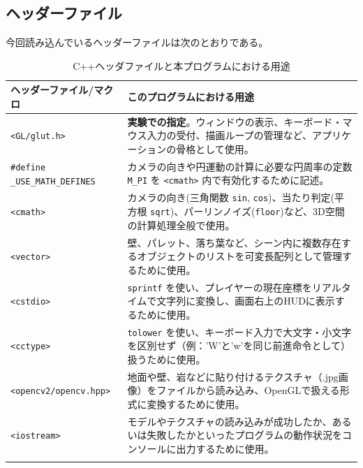 \documentclass[upIatex,dvipdfmx,a4paper]{jsarticle}
\begin{document}
\subsection{ヘッダーファイル}
今回読み込んでいるヘッダーファイルは次のとおりである。
\begin{table}[H]
    \centering
    \caption{C++ヘッダファイルと本プログラムにおける用途}
    \label{tab:cpp_headers_intent}
    \begin{tabular}{lp{10cm}}
    \toprule
    \textbf{ヘッダーファイル/マクロ} & \textbf{このプログラムにおける用途} \\
    \midrule
    \texttt{<GL/glut.h>} & \textbf{実験での指定}。ウィンドウの表示、キーボード・マウス入力の受付、描画ループの管理など、アプリケーションの骨格として使用。 \\ \addlinespace

    \texttt{\#define \_USE\_MATH\_DEFINES} & カメラの向きや円運動の計算に必要な円周率の定数 \texttt{M\_PI} を \texttt{<cmath>} 内で有効化するために記述。 \\ \addlinespace

    \texttt{<cmath>} & カメラの向き(三角関数 \texttt{sin}, \texttt{cos})、当たり判定(平方根 \texttt{sqrt})、パーリンノイズ(\texttt{floor})など、3D空間の計算処理全般で使用。 \\ \addlinespace

    \texttt{<vector>} & 壁、パレット、落ち葉など、シーン内に複数存在するオブジェクトのリストを可変長配列として管理するために使用。 \\ \addlinespace

    \texttt{<cstdio>} & \texttt{sprintf} を使い、プレイヤーの現在座標をリアルタイムで文字列に変換し、画面右上のHUDに表示するために使用。 \\ \addlinespace

    \texttt{<cctype>} & \texttt{tolower} を使い、キーボード入力で大文字・小文字を区別せず（例：'W'と'w'を同じ前進命令として）扱うために使用。 \\ \addlinespace

    \texttt{<opencv2/opencv.hpp>} & 地面や壁、岩などに貼り付けるテクスチャ（.jpg画像）をファイルから読み込み、OpenGLで扱える形式に変換するために使用。 \\ \addlinespace

    \texttt{<iostream>} & モデルやテクスチャの読み込みが成功したか、あるいは失敗したかといったプログラムの動作状況をコンソールに出力するために使用。 \\ \addlinespace


\end{tabular}
\end{table}
\end{document}
